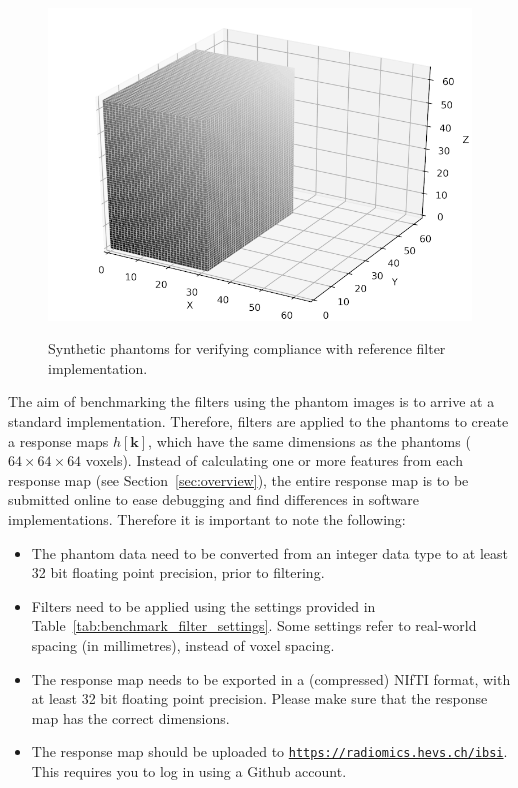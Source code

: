 \documentclass[fleqn,a4paper,oneside,openany]{book}
\begin{document}
\begin{figure}
\begin{minipage}[b]{145pt}
     \centering
     \includegraphics[trim = 0 0 0 0, clip, width=\linewidth] {phantom_figures/orientation.png}
     \label{fig:phantom_orientation}
     \hspace{100pt}
   \end{minipage}
  \caption{Synthetic phantoms for verifying compliance with reference filter implementation.
  }
  \label{fig:synthetic_phantom}
\end{figure}

\FloatBarrier

The aim of benchmarking the filters using the phantom images is to arrive at a standard implementation. Therefore, filters are applied to the phantoms to create a response maps $h[\boldsymbol{k}]$, which have the same dimensions as the phantoms ($64\times 64\times 64$ voxels). Instead of calculating one or more features from each response map (see Section~\ref{sec:overview}), the entire response map is to be submitted online to ease debugging and find differences in software implementations.
Therefore it is important to note the following:
%
\begin{itemize}
\item The phantom data need to be converted from an integer data type to at least 32 bit floating point precision, prior to filtering.
\item Filters need to be applied using the settings provided in Table~\ref{tab:benchmark_filter_settings}. Some settings refer to real-world spacing (in millimetres), instead of voxel spacing. 
\item The response map needs to be exported in a (compressed) NIfTI format, with at least 32 bit floating point precision. Please make sure that the response map has the correct dimensions.
\item The response map should be uploaded to \href{https://radiomics.hevs.ch/ibsi}{\texttt{https://radiomics.hevs.ch/ibsi}}. This requires you to log in using a Github account.
\end{itemize}
\end{document}
